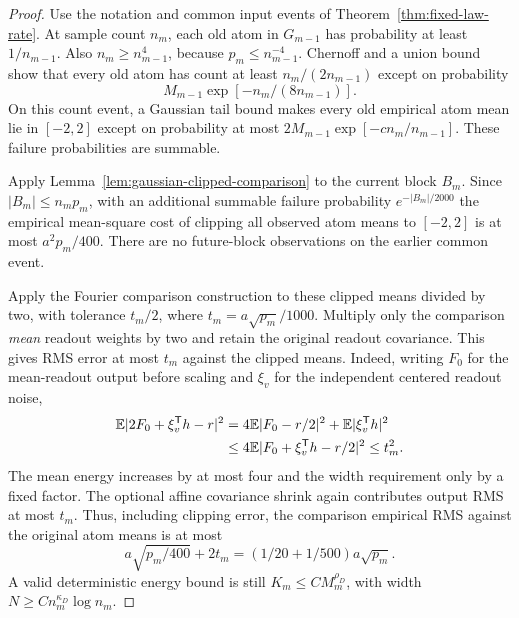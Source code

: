 \begin{proof}
Use the notation and common input events of Theorem~\ref{thm:fixed-law-rate}. At sample count $n_m$, each old atom in $G_{m-1}$ has probability at least $1/n_{m-1}$. Also $n_m\ge n_{m-1}^4$, because $p_m\le n_{m-1}^{-4}$. Chernoff and a union bound show that every old atom has count at least $n_m/(2n_{m-1})$ except on probability
\[
 M_{m-1}\exp[-n_m/(8n_{m-1})].
\]
On this count event, a Gaussian tail bound makes every old empirical atom mean lie in $[-2,2]$ except on probability at most
$2M_{m-1}\exp[-c n_m/n_{m-1}]$. These failure probabilities are summable.

Apply Lemma~\ref{lem:gaussian-clipped-comparison} to the current block $B_m$. Since $|B_m|\le n_mp_m$, with an additional summable failure probability $e^{-|B_m|/2000}$ the empirical mean-square cost of clipping all observed atom means to $[-2,2]$ is at most $a^2p_m/400$. There are no future-block observations on the earlier common event.

Apply the Fourier comparison construction to these clipped means divided by two, with tolerance $t_m/2$, where $t_m=a\sqrt{p_m}/1000$. Multiply only the comparison \emph{mean} readout weights by two and retain the original readout covariance. This gives RMS error at most $t_m$ against the clipped means. Indeed, writing $F_0$ for the mean-readout output before scaling and $\xi_v$ for the independent centered readout noise,
\begin{align*}
 \mathbb E|2F_0+\xi_v^{\mathsf T}h-r|^2
 &=4\mathbb E|F_0-r/2|^2+\mathbb E|\xi_v^{\mathsf T}h|^2\\
 &\le4\mathbb E|F_0+\xi_v^{\mathsf T}h-r/2|^2\le t_m^2.
\end{align*}
The mean energy increases by at most four and the width requirement only by a fixed factor. The optional affine covariance shrink again contributes output RMS at most $t_m$. Thus, including clipping error, the comparison empirical RMS against the original atom means is at most
\[
 a\sqrt{p_m/400}+2t_m=(1/20+1/500)a\sqrt{p_m}.
\]
A valid deterministic energy bound is still $K_m\le C M_m^{\rho_D}$, with width $N\ge C n_m^{\kappa_D}\log n_m$.


\end{proof}
